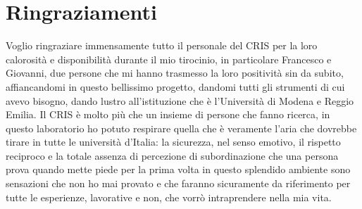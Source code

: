 \documentclass[a4paper, twoside,openright]{report}
\begin{document}

\let\cleardoublepage\clearpage
\dedication{\textit{
    Dediche:\newline
    A Eleonora e alla sua immensa presenza in tutte le mie vite.\newline
    Ai miei genitori, sempre al mio fianco, senza mai chiedere niente in cambio.\newline
    A Barbara, Tiziano, Leonardo, Marcello e Michele, la mia seconda famiglia. 
}}
\newpage

\section*{Ringraziamenti}
Voglio ringraziare immensamente tutto il personale del CRIS per la loro calorosità e disponibilità durante il mio tirocinio, in particolare Francesco e Giovanni, due persone che mi hanno trasmesso la loro positività sin da subito, affiancandomi in questo bellissimo progetto, dandomi tutti gli strumenti di cui avevo bisogno, dando lustro all'istituzione che è l'Università di Modena e Reggio Emilia.
\newline
\newline
Il CRIS è molto più che un insieme di persone che fanno ricerca, in questo laboratorio ho potuto respirare quella che è veramente l'aria che dovrebbe tirare in tutte le università d'Italia: la sicurezza, nel senso emotivo, il rispetto reciproco e la totale assenza di percezione di subordinazione che una persona prova quando mette piede per la prima volta in questo splendido ambiente sono sensazioni che non ho mai provato e che faranno sicuramente da riferimento per tutte le esperienze, lavorative e non, che vorrò intraprendere nella mia vita.
\tableofcontents

\listoffigures







\end{document}
